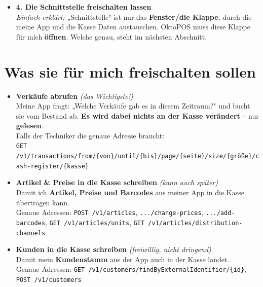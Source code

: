 \documentclass[11pt,a4paper]{article}
\newcommand{\cb}{{\Large$\square$}\ }
\newcommand{\code}[1]{\texttt{\small #1}}
\newcommand{\techniker}[1]{{\footnotesize\color{dunkelgrau}#1}}
\begin{document}
\begin{itemize}
  \item[\cb] \textbf{4. Die Schnittstelle freischalten lassen}\\[2pt]
        \emph{Einfach erklärt:} „Schnittstelle" ist nur das \textbf{Fenster/die Klappe}, durch die meine
        App und die Kasse Daten austauschen. OktoPOS muss diese Klappe für mich \textbf{öffnen}.
        Welche genau, steht im nächsten Abschnitt.

\end{itemize}

\section{Was sie für mich freischalten sollen}

\begin{itemize}
  \item[\cb] \textbf{Verkäufe abrufen} \emph{(das Wichtigste!)}\\[2pt]
        Meine App fragt: „Welche Verkäufe gab es in diesem Zeitraum?" und bucht sie vom Bestand ab.
        \textbf{Es wird dabei nichts an der Kasse verändert} – nur \textbf{gelesen}.\\
        \techniker{Falls der Techniker die genaue Adresse braucht:\\
        \code{GET /v1/transactions/from/\{von\}/until/\{bis\}/page/\{seite\}/size/\{größe\}/cash-register/\{kasse\}}}

  \item[\cb] \textbf{Artikel \& Preise in die Kasse schreiben} \emph{(kann auch später)}\\[2pt]
        Damit ich \textbf{Artikel, Preise und Barcodes} aus meiner App in die Kasse übertragen kann.\\
        \techniker{Genaue Adressen: \code{POST /v1/articles}, \code{.../change-prices}, \code{.../add-barcodes},
        \code{GET /v1/articles/units}, \code{GET /v1/articles/distribution-channels}}

  \item[\cb] \textbf{Kunden in die Kasse schreiben} \emph{(freiwillig, nicht dringend)}\\[2pt]
        Damit mein \textbf{Kundenstamm} aus der App auch in der Kasse landet.\\
        \techniker{Genaue Adressen: \code{GET /v1/customers/findByExternalIdentifier/\{id\}}, \code{POST /v1/customers}}
\end{itemize}
\end{document}

